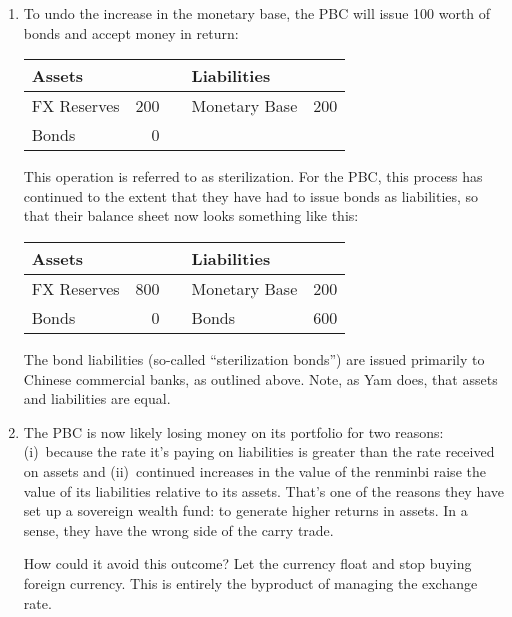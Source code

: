 \documentclass[letterpaper,12pt]{article}
\begin{document}
\begin{enumerate}
\begin{enumerate}
\item To undo the increase in the monetary base, the PBC will issue 100 worth of bonds and accept money in return:  
%
\begin{center}
\begin{tabular}{lrclr}
               Assets  &     &&     Liabilities                     \\  
               \hline 
               FX Reserves &  200 &&     Monetary Base &  200   \\    
               Bonds   & 0 && \\
\end{tabular}
\end{center}
%
This operation is referred to as sterilization.  
For the PBC, this process has continued to the extent that they
have had to issue bonds as liabilities, so that their balance sheet now looks something like this:  
%
\begin{center}
\begin{tabular}{lrclr}
               Assets  &     &&     Liabilities                     \\  
               \hline 
               FX Reserves &  800 &&     Monetary Base &  200   \\    
               Bonds   &  0 &&    Bonds  &  600 \\
\end{tabular}
\end{center}
%
The bond liabilities (so-called ``sterilization bonds'') 
are issued primarily to Chinese commercial banks, 
as outlined above.  
Note, as Yam does, that assets and liabilities are equal.  

\item The PBC is now likely losing money on its portfolio 
for two reasons:
(i)~because the rate it's paying on liabilities is greater than 
the rate received on assets and 
(ii)~continued increases in the value of the renminbi raise 
the value of its liabilities relative to its assets.  
That's one of the reasons they have set up a sovereign wealth fund:
to generate higher returns in assets.  
In a sense, they have the wrong side of the carry trade.  

How could it avoid this outcome?  
Let the currency float and stop buying foreign currency.
This is entirely the byproduct of managing the exchange rate.  

\end{enumerate}



\end{enumerate}
\end{document}
